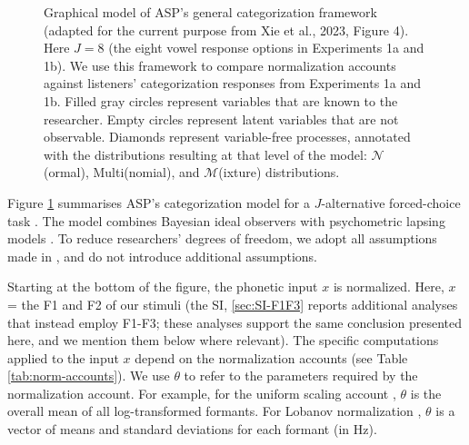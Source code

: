 \documentclass[preprint]{JASA}
\begin{document}
\begin{figure}[!ht]
\begin{center}
\caption{Graphical model of ASP's general categorization framework (adapted for the current purpose from Xie et al., 2023, Figure 4). Here $J=8$ (the eight vowel response options in Experiments 1a and 1b). We use this framework to compare normalization accounts against listeners' categorization responses from Experiments 1a and 1b. Filled gray circles represent variables that are known to the researcher. Empty circles represent latent variables that are not observable. Diamonds represent variable-free processes, annotated with the distributions resulting at that level of the model: $\mathcal{N}$(ormal), Multi(nomial), and $\mathcal{M}$(ixture) distributions.} \label{fig:model-perceptual-decision-making}
\end{center}
\end{figure}

Figure \ref{fig:model-perceptual-decision-making} summarises ASP's categorization model for a \(J\)-alternative forced-choice task \citep[for an in-depth description, we refer to][]{xie2023}. The model combines Bayesian ideal observers \citetext{\citealp[as used in e.g.,][]{clayards2008}; \citealp{feldman2009}; \citealp{norris-mcqueen2008}; \citealp{xie2021}; \citealp[for a closely related approach, see also][]{nearey-hogan1986}} with psychometric lapsing models \citep{wichmann-hill2001}. To reduce researchers' degrees of freedom, we adopt all assumptions made in \citet{xie2023}, and do not introduce additional assumptions.

Starting at the bottom of the figure, the phonetic input \(x\) is normalized. Here, \(x\) = the F1 and F2 of our stimuli (the SI, \ref{sec:SI-F1F3} reports additional analyses that instead employ F1-F3; these analyses support the same conclusion presented here, and we mention them below where relevant). The specific computations applied to the input \(x\) depend on the normalization accounts (see Table \ref{tab:norm-accounts}). We use \(\theta\) to refer to the parameters required by the normalization account. For example, for the uniform scaling account \citep{nearey1978}, \(\theta\) is the overall mean of all log-transformed formants. For Lobanov normalization \citep{lobanov1971}, \(\theta\) is a vector of means and standard deviations for each formant (in Hz).
\end{document}
